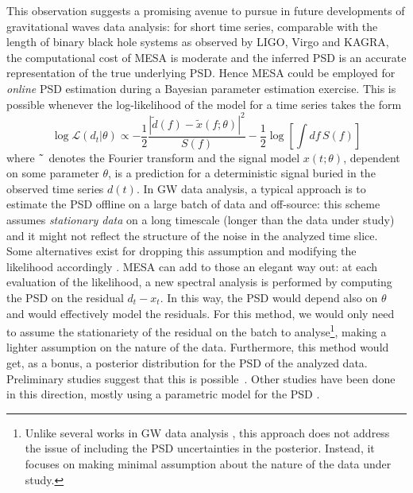 \documentclass{aa}
\newcommand{\todo}[1]{{\textcolor{red}{\texttt{TODO: #1}} }}
\begin{document}
This observation suggests a promising avenue to pursue in future developments of gravitational waves data analysis: for short time series, comparable with the length of binary black hole systems as observed by LIGO, Virgo and KAGRA, the computational cost of MESA is moderate and the inferred PSD is an accurate representation of the true underlying PSD. Hence MESA could be employed for {\it online} PSD estimation during a Bayesian parameter estimation exercise.
This is possible whenever the log-likelihood of the model for a time series takes the form
\begin{equation}
	\log\mathcal{L}(d_t | \theta) \propto  -\frac{1}{2} \frac{|\tilde{d}(f)- \tilde{x}(f;\theta)|^2}{S(f)} - \frac{1}{2}\log\left[\int  df\,S(f)\right]
\end{equation}
where $\tilde{\hphantom{a}}$ denotes the Fourier transform and the signal model $x(t;\theta)$, dependent on some parameter $\theta$, is a prediction for a deterministic signal buried in the observed time series $d(t)$.
In GW data analysis, a typical approach is to estimate the PSD offline on a large batch of data and off-source: this scheme assumes {\it stationary data} on a long timescale (longer than the data under study) and it might not reflect the structure of the noise in the analyzed time slice.
Some alternatives exist for dropping this assumption and modifying the likelihood accordingly \citep{R_ver_2010, R_ver_2011, Edwards_2020, Chatziioannou_2021}.
MESA can add to those an elegant way out: at each evaluation of the likelihood, a new spectral analysis is performed by computing the PSD on the residual $d_t-x_t$.
In this way, the PSD would depend also on $\theta$ and would effectively model the residuals. For this method, we would only need to assume the stationariety of the residual on the batch to analyse\footnote{
Unlike several works in GW data analysis \citep{Biscoveanu_2020, talbot2020gravitationalwave}, this approach does not address the issue of including the PSD uncertainties in the posterior. Instead, it focuses on making minimal assumption about the nature of the data under study.
}, making a lighter assumption on the nature of the data. Furthermore, this method would get, as a bonus, a posterior distribution for the PSD of the analyzed data.
Preliminary studies suggest that this is possible~\citep{martini_thesis}.
Other studies have been done in this direction, mostly using a parametric model for the PSD \citep{Littenberg_2013, Edwards_2015, lalinference}.
\end{document}
